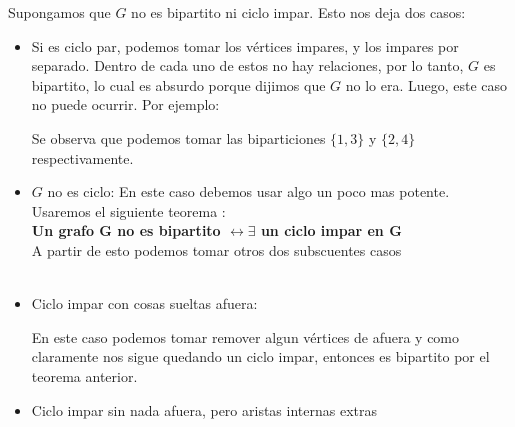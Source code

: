 \documentclass{article}
\begin{document}
Supongamos que $G$ no es bipartito ni ciclo impar. Esto nos deja dos casos:
\begin{itemize}


\item Si es ciclo par, podemos tomar los vértices impares, y los impares por separado. Dentro de cada uno de estos no hay relaciones, por lo tanto, $G$ es bipartito, lo cual es absurdo porque dijimos que $G$ no lo era. Luego, este caso no puede ocurrir. Por ejemplo:

\begin{center}
\end{center}

Se observa que podemos tomar las biparticiones $\{1,3\}$ y $\{2,4\}$ respectivamente.

\item $G$ no es ciclo: En este caso debemos usar algo un poco mas potente. Usaremos el siguiente teorema : \\ 
\textbf{ Un grafo G no es bipartito  $\leftrightarrow \exists$ un ciclo impar en G}\\
 A partir de esto podemos tomar otros dos subscuentes casos \\\\
\newpage
\item Ciclo impar con cosas sueltas afuera:
\begin{center}
\end{center}
En este caso podemos tomar remover algun vértices de afuera y como claramente nos sigue quedando un ciclo impar, entonces es bipartito por el teorema anterior.
		
\item Ciclo impar sin nada afuera, pero aristas internas extras
\begin{center}


\end{center}
\end{itemize}
\end{document}
